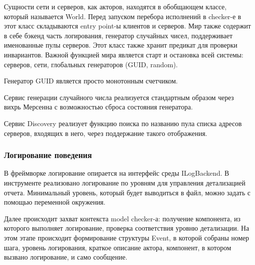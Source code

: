 Сущности сети и серверов, как акторов, находятся в обобщающем классе, который называется World. Перед запуском перебора исполнений в checker-е в этот класс складываются entry point-ы клиентов и серверов. Мир также содержит в себе бэкенд часть логирования, генератор случайных чисел, поддерживает именованные пулы серверов. Этот класс также хранит предикат для проверки инвариантов. Важной функцией мира является старт и остановка всей системы: серверов, сети, глобальных генераторов (GUID, random).

Генератор GUID является просто монотонным счетчиком.

Сервис генерации случайного числа реализуется стандартным образом через вихрь Мерсенна с возможностью сброса состояния генератора.

Сервис Discovery реализует функцию поиска по названию пула списка адресов серверов, входящих в него, через поддержание такого отображения.

\subsubsection{Логирование поведения}

В фреймворке логирование опирается на интерфейс среды ILogBackend. В инструменте реализовано логирование по уровням для управления детализацией отчета. Минимальный уровень, который будет выводиться в файл, можно задать с помощью переменной окружения. 

Далее происходит захват контекста model checker-а: получение компонента, из которого выполняет логирование, проверка соответствия уровню детализации. На этом этапе происходит формирование структуры Event, в которой собраны номер шага, уровень логирования, краткое описание актора, компонент, в котором вызвано логирование, и само сообщение.
